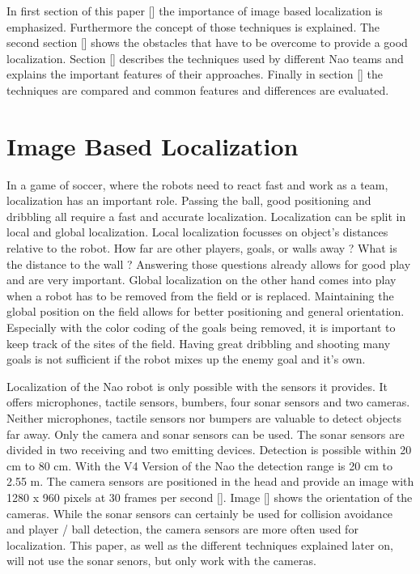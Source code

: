 \documentclass[12pt, a4paper]{scrartcl}
\begin{document}
  In first section of this paper [] the importance of image based localization is emphasized. Furthermore the concept of those techniques is explained. The second section [] shows the obstacles that have to be overcome to provide a good localization. Section [] describes the techniques used by different Nao teams and explains the important features of their approaches. Finally in section [] the techniques are compared and common features and differences are evaluated.


  \section{Image Based Localization}
  In a game of soccer, where the robots need to react fast and work as a team, localization has an important role. Passing the ball, good positioning and dribbling all require a fast and accurate localization. Localization can be split in local and global localization. Local localization focusses on object's distances relative to the robot. How far are other players, goals, or walls away ? What is the distance to the wall ? Answering those questions already allows for good play and are very important. Global localization on the other hand comes into play when a robot has to be removed from the field or is replaced. Maintaining the global position on the field allows for better positioning and general orientation. Especially with the color coding of the goals being removed, it is important to keep track of the sites of the field. Having great dribbling and shooting many goals is not sufficient if the robot mixes up the enemy goal and it's own.

  Localization of the Nao robot is only possible with the sensors it provides. It offers microphones, tactile sensors, bumbers, four sonar sensors and two cameras. Neither microphones, tactile sensors nor bumpers are valuable to detect objects far away. Only the camera and sonar sensors can be used. The sonar sensors are divided in two receiving and two emitting devices. Detection is possible within 20 cm to 80 cm. With the V4 Version of the Nao the detection range is 20 cm to 2.55 m. The camera sensors are positioned in the head and provide an image with 1280 x 960 pixels at 30 frames per second []. Image [] shows the orientation of the cameras. While the sonar sensors can certainly be used for collision avoidance and player / ball detection, the camera sensors are more often used for localization. This paper, as well as the different techniques explained later on, will not use the sonar senors, but only work with the cameras.
\end{document}
